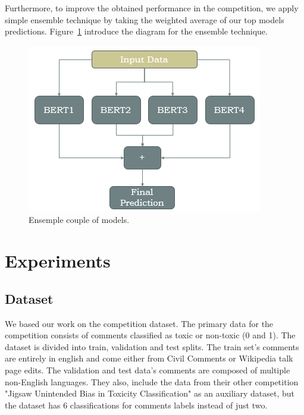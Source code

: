\documentclass[10pt,twocolumn,letterpaper]{article}
\begin{document}
Furthermore, to improve the obtained performance in the competition, we apply simple ensemble technique by taking the weighted average of our top models predictions. Figure~\ref{EnsempleCoupleOfModels} introduce the diagram for the ensemble technique.   

\begin{figure}[htbp]
\centerline{\includegraphics[width=0.999\columnwidth]{Figures/EnsempleCoupleOfModels.png}}
\caption{Ensemple couple of models.}
\label{EnsempleCoupleOfModels}
\end{figure}


\section{Experiments}

\subsection{Dataset}
We based our work on the competition dataset. The primary data for the competition consists of comments classified as toxic or non-toxic (0 and 1). The dataset is divided into train, validation and test splits. The train set’s comments are entirely in english and come either from Civil Comments or Wikipedia talk page edits. The validation and test data's comments are composed of multiple non-English languages\cite{Jigsaw}. They also, include the data from their other competition "Jigsaw Unintended Bias in Toxicity Classification"\cite{Jigsaw2} as an auxiliary dataset, but the dataset has 6 classifications for comments labels instead of just two.
\end{document}
